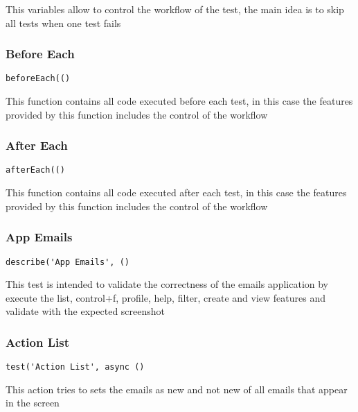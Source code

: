 \documentclass[a4paper]{article}
\begin{document}
This variables allow to control the workflow of the test, the main idea is to
skip all tests when one test fails

\hypertarget{toc571}{}
\subsubsection{Before Each}

\begin{lstlisting}
beforeEach(()
\end{lstlisting}

This function contains all code executed before each test, in this case the
features provided by this function includes the control of the workflow

\hypertarget{toc572}{}
\subsubsection{After Each}

\begin{lstlisting}
afterEach(()
\end{lstlisting}

This function contains all code executed after each test, in this case the
features provided by this function includes the control of the workflow

\hypertarget{toc573}{}
\subsubsection{App Emails}

\begin{lstlisting}
describe('App Emails', ()
\end{lstlisting}

This test is intended to validate the correctness of the emails application by
execute the list, control+f, profile, help, filter, create and view features and
validate with the expected screenshot

\hypertarget{toc574}{}
\subsubsection{Action List}

\begin{lstlisting}
test('Action List', async ()
\end{lstlisting}

This action tries to sets the emails as new and not new of all emails that
appear in the screen
\end{document}
